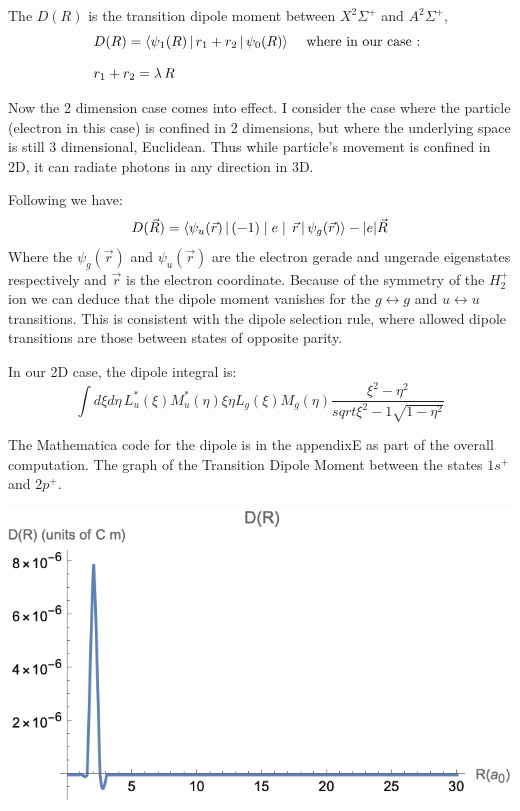 The $ D(R) $ is the transition dipole moment  between $ X^2\Sigma^{+} $  and $ A^2\Sigma^{+} $, \begin{equation}
\begin{split}
& D(R) = \Braket{\psi_1(R) | r_1 +  r_2 | \psi_0(R) } \,\,\,\,\,\text{ where in our case : } \\[.8em] 
& r_1 + r_2 = \lambda\, R
\end{split}
\end{equation}

Now the 2 dimension case comes into effect. I consider the case where the particle (electron in this case) is confined in 2 dimensions, but where the underlying space is still 3 dimensional, Euclidean. Thus while particle's movement is confined in 2D, it can radiate photons in any direction in 3D.

Following \cite{DRZygelman} we have:
\begin{equation}
D(\vec{R}) = \Braket{\psi_u(\vec{r}) | (-1)\mid e \mid\,\vec{r} | \psi_g(\vec{r})} - |e|\vec{R}
\end{equation}
Where the $ \psi_g(\vec{r}) $ and $ \psi_u(\vec{r}) $ are the electron gerade and ungerade eigenstates respectively and $ \vec{r} $ is the electron coordinate.
Because of the symmetry of the $ H_2^+ $ ion we can deduce that the dipole moment vanishes for the $ g \leftrightarrow g $ and $ u \leftrightarrow u $ transitions. This is consistent with the dipole selection rule, where allowed dipole transitions are those between states of opposite parity.

In our 2D case, the dipole integral is:
\begin{equation}
  \int{d\xi d\eta\,L_u^*(\xi)M_u^*(\eta)\xi \eta L_g(\xi)M_g(\eta)\frac{\xi^2-\eta^2}{sqrt{\xi^2-1}\sqrt{1-\eta^2}}}
\end{equation}
 
The Mathematica code for the dipole is in the appendixE as part of the overall computation.
The graph of the Transition Dipole Moment between the states $ 1s^{+} $ and $ 2p^{+} $.

\includegraphics{DR-SI.png}

